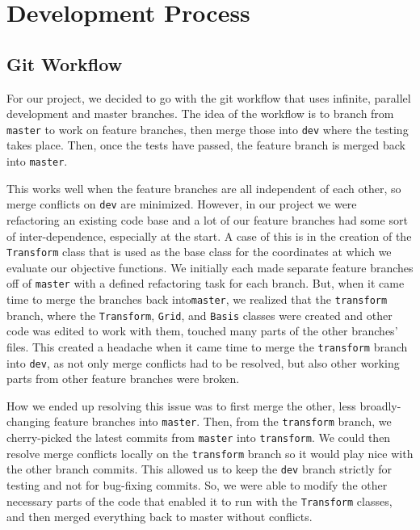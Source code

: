 \documentclass{article}
\begin{document}
\section{Development Process}

\subsection{Git Workflow}

For our project, we decided to go with the git workflow that uses infinite, parallel development and master branches.
The idea of the workflow is to branch from \texttt{master} to work on feature branches, then merge those into \texttt{dev} where the testing takes place.
Then, once the tests have passed, the feature branch is merged back into \texttt{master}.

This works well when the feature branches are all independent of each other, so merge conflicts on \texttt{dev} are minimized.
However, in our project we were refactoring an existing code base and a lot of our feature branches had some sort of inter-dependence, especially at the start.
A case of this is in the creation of the \texttt{Transform} class that is used as the base class for the coordinates at which we evaluate our objective functions.
We initially each made separate feature branches off of \texttt{master} with a defined refactoring task for each branch.
But, when it came time to merge the branches back into\texttt{master}, we realized that the \texttt{transform} branch, where the \texttt{Transform}, \texttt{Grid}, and \texttt{Basis} classes were created and other code was edited to work with them, touched many parts of the other branches' files.
This created a headache when it came time to merge the \texttt{transform} branch into \texttt{dev}, as not only merge conflicts had to be resolved, but also other working parts from other feature branches were broken.

How we ended up resolving this issue was to first merge the other, less broadly-changing feature branches into \texttt{master}.
Then, from the \texttt{transform} branch, we cherry-picked the latest commits from \texttt{master} into \texttt{transform}.
We could then resolve merge conflicts locally on the \texttt{transform} branch so it would play nice with the other branch commits.
This allowed us to keep the \texttt{dev} branch strictly for testing and not for bug-fixing commits.
So, we were able to modify the other necessary parts of the code that enabled it to run with the \texttt{Transform} classes, and then merged everything back to master without conflicts.
\end{document}
